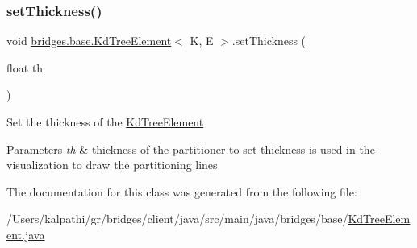 \subsubsection{\texorpdfstring{set\+Thickness()}{setThickness()}}
{\footnotesize\ttfamily void \mbox{\hyperlink{classbridges_1_1base_1_1_kd_tree_element}{bridges.\+base.\+Kd\+Tree\+Element}}$<$ K, E $>$.set\+Thickness (\begin{DoxyParamCaption}\item[{float}]{th }\end{DoxyParamCaption})}

Set the thickness of the \mbox{\hyperlink{classbridges_1_1base_1_1_kd_tree_element}{Kd\+Tree\+Element}} 
\begin{DoxyParams}{Parameters}
{\em th} & thickness of the partitioner to set thickness is used in the visualization to draw the partitioning lines \\
\hline
\end{DoxyParams}


The documentation for this class was generated from the following file\+:\begin{DoxyCompactItemize}
\item 
/\+Users/kalpathi/gr/bridges/client/java/src/main/java/bridges/base/\mbox{\hyperlink{_kd_tree_element_8java}{Kd\+Tree\+Element.\+java}}\end{DoxyCompactItemize}
